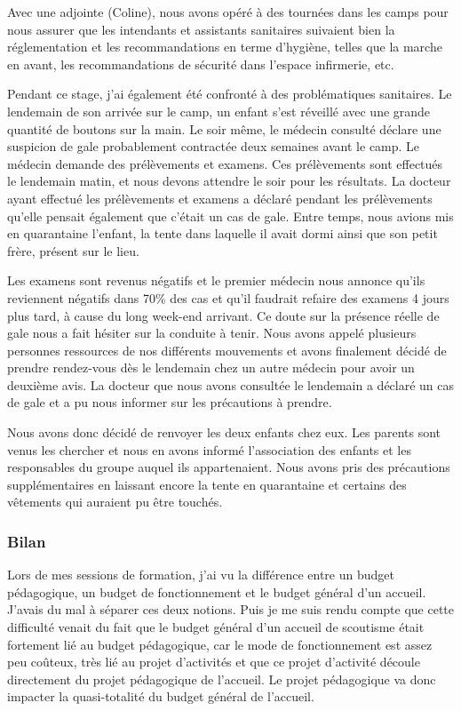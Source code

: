 \documentclass[titlepage,11pt,a4paper]{article}
\begin{document}
Avec une adjointe (Coline), nous avons opéré à des tournées dans les camps pour nous
assurer que les intendants et assistants sanitaires suivaient bien la réglementation et
les recommandations en terme d'hygiène, telles que la marche en avant, les recommandations
de sécurité dans l'espace infirmerie, etc.

Pendant ce stage, j'ai également été confronté à des problématiques
sanitaires. Le lendemain de son arrivée sur le camp, un enfant s'est réveillé avec une
grande quantité de boutons sur la main. Le soir même, le médecin consulté déclare une
suspicion de gale probablement contractée deux semaines avant le camp. Le médecin demande
des prélèvements et examens. Ces prélèvements sont effectués
le lendemain matin, et nous devons attendre le soir pour les résultats. La docteur ayant
effectué les prélèvements et examens a déclaré pendant les prélèvements qu'elle pensait
également que c'était un cas de gale. Entre temps, nous avions mis en quarantaine
l'enfant, la tente dans laquelle il avait dormi ainsi que son petit frère, présent sur le
lieu.

Les examens sont revenus négatifs et le premier médecin nous annonce qu'ils reviennent
négatifs dans 70\% des cas et qu'il faudrait refaire des examens 4 jours plus tard, à cause du long
week-end arrivant. Ce doute sur la présence réelle de gale nous a fait hésiter sur la
conduite à tenir. Nous avons appelé plusieurs personnes ressources de nos différents
mouvements et avons finalement décidé de prendre rendez-vous dès le lendemain chez un
autre médecin pour avoir un deuxième avis. La docteur que nous avons consultée le
lendemain a déclaré un cas de gale et a pu nous informer sur les précautions à prendre.

Nous avons donc décidé de renvoyer les deux enfants chez eux. Les parents sont venus les
chercher et nous en avons informé l'association des enfants et les responsables du groupe
auquel ils appartenaient. Nous avons pris des précautions supplémentaires en laissant
encore la tente en quarantaine et certains des vêtements qui auraient pu être touchés.

\subsubsection{Bilan}

Lors de mes sessions de formation, j'ai vu la différence entre un budget pédagogique, un
budget de fonctionnement et le budget général d'un accueil. J'avais du mal à séparer ces deux notions. Puis je
me suis rendu compte que cette difficulté venait du fait que le budget général d'un
accueil de scoutisme était fortement lié au budget pédagogique, car le mode de
fonctionnement est assez peu coûteux, très lié au projet d'activités et que ce projet
d'activité découle directement du projet pédagogique de l'accueil. Le projet pédagogique
va donc impacter la quasi-totalité du budget général de l'accueil.
\end{document}
